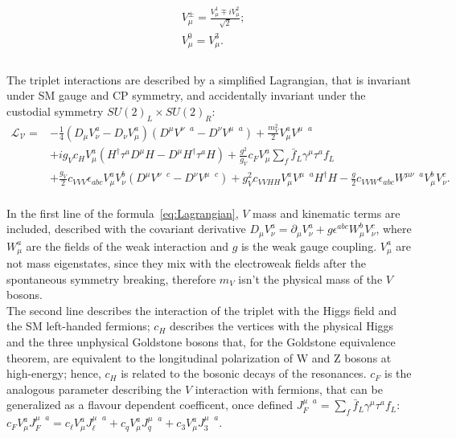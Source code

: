 \begin{equation}
\begin{split}
& V_{\mu}^{\pm} = \frac{V_{\mu}^1 \mp i V_{\mu}^2}{\sqrt{2}};\\
& V_{\mu}^0 = V_{\mu}^3.\\
\end{split}
\label{eq:V_triplet}
\end{equation}
\\
The triplet interactions are described by a simplified Lagrangian, that is invariant under SM gauge and CP symmetry, and accidentally invariant under the custodial symmetry $SU(2)_L \times SU(2)_R$:
\begin{equation}
\begin{split}
\mathcal{L_V} ={} & -\frac{1}{4} \left(D_{\mu}V_{\nu}^a - D_{\nu}V_{\mu}^a \right) \left( D^{\mu}V^{\nu \mbox{ } a} - D^{\nu}V^{\mu \mbox{ } a} \right) + \frac{m_V^2}{2}V_{\mu}^aV^{\mu \mbox{ } a} \\
 & +i g_V c_H V_{\mu}^a \left( H^{\dagger} \tau^a D^{\mu}H - D^{\mu}H^{\dagger} \tau^a H \right) + \frac{g^2}{g_V}c_F V_{\mu}^a \sum_{f} \bar{f}_L \gamma^{\mu} \tau^a f_L \\
 & + \frac{g_V}{2} c_{VVV} \epsilon_{abc} V_{\mu}^a V_{\nu}^b \left( D^{\mu}V^{\nu \mbox{ } c} - D^{\nu}V^{\mu \mbox{ } c}\right) + g_V^2 c_{VVHH} V_{\mu}^a V^{\mu \mbox{ } a} H^{\dagger} H - \frac{g}{2} c_{VVW} \epsilon_{abc} W^{\mu \nu \mbox{ } a} V_{\mu}^b V_{\nu}^c.
\end{split}
\label{eq:Lagrangian}
\end{equation}
\\
In the first line of the formula~\ref{eq:Lagrangian}, $V$ mass and kinematic terms are included, described with the covariant derivative $D_{\mu} V_{\nu}^a = \partial_{\mu} V_{\nu}^a + g \epsilon^{abc} W_{\mu}^b V_{\nu}^c$, where $W_{\mu}^a$ are the fields of the weak interaction and $g$ is the weak gauge coupling. $V_{\mu}^a$ are not mass eigenstates, since they mix with the electroweak fields after the spontaneous symmetry breaking, therefore $m_V$ isn't the physical mass of the $V$ bosons.\\
The second line describes the interaction of the triplet with the Higgs field and the SM left-handed fermions; $c_H$ describes the vertices with the physical Higgs and the three unphysical Goldstone bosons that, for the Goldstone equivalence theorem, are equivalent to the longitudinal polarization of W and Z bosons at high-energy; hence, $c_H$ is related to the bosonic decays of the resonances. $c_F$ is the analogous parameter describing the $V$ interaction with fermions, that can be generalized as a flavour dependent coefficent, once defined $J_F^{\mu \mbox{ } a} = \sum_{f} \bar{f}_L \gamma^{\mu} \tau^a f_L$: $c_F V_{\mu}^a  J_F^{\mu \mbox{ } a} = c_{\ell} V_{\mu}^a  J_{\ell}^{\mu \mbox{ } a} + c_{q} V_{\mu}^a  J_{q}^{\mu \mbox{ } a} + c_{3} V_{\mu}^a  J_{3}^{\mu \mbox{ } a}$.\\
